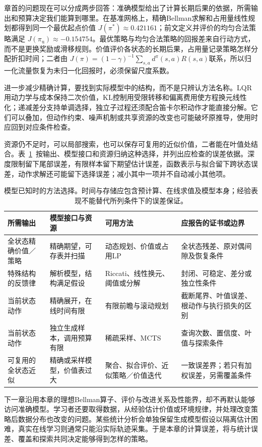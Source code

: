 章首的问题现在可以分成两步回答：准确模型给出了计算长期后果的依据，所需输出和预算决定我们能算到哪里。在基准网格上，精确Bellman求解和占用量线性规划都得到同一个最优起点价值
$J(\pi^*)\approx0.421161$；前文定义并评价的均匀合法策略满足
$J(\pi_{\mathrm u})\approx-0.154754$。最优策略与均匀合法策略的回报差来自行动方式，而不是更换奖励或滑移规则。价值评价各状态的长期后果，占用量记录策略怎样分配折扣时间；二者由
$J(\pi)=(1-\gamma)^{-1}\sum_{s,a}d^\pi(s,a)R(s,a)$联系，所以归一化流量恢复为未归一化回报时，必须保留尺度系数。

进一步减少精确计算，要找到实际模型中的结构，而不是只辨认方法名称。LQR用动力学与成本保持二次价值，KL控制用受限转移和偏离费用使方程换元线性化；递减差分支持单调选择，独立子过程还须配合笛卡尔积动作才能直接分解。它们可以叠加，但动作约束、噪声机制或共享资源的改变也可能破坏原推导，使用时应回到对应条件检查。

资源仍不足时，可以局部搜索，也可以保存可复用的近似价值，二者能在叶值处结合。表~\ref{tab:rl-planning-method-choice}~按输出、模型接口和资源归纳这种选择，并列出应检查的误差依据。深度限制留下尾部误差，有限样本留下期望估计误差，函数表示与拟合留下跨状态误差，动作求解还可能留下选择误差；减小其中一项并不自动减小其他项。

\begin{table}[htbp]
 \centering
 \small
 \begin{tabularx}{\linewidth}{@{}l>{\raggedright\arraybackslash}X>{\raggedright\arraybackslash}X>{\raggedright\arraybackslash}X@{}}
  \toprule
  所需输出 & 模型接口与资源 & 可用方法 & 应报告的证书或边界\\
  \midrule
  全状态精确价值／策略 & 精确期望，可存表并扫描 & 动态规划、价值或占用LP & 全状态残差、原对偶间隙及恢复条件\\
  特殊结构的反馈律 & 解析模型，结构满足假设 & Riccati、线性换元、阈值或分解 & 封闭、可稳定、差分或独立性条件\\
  当前状态动作 & 精确展开，在线时间有限 & 有限前瞻与滚动规划 & 截断尾界、叶值误差、根动作与执行损失的区别\\
  当前状态动作 & 独立生成样本，调用预算有限 & 稀疏采样、MCTS & 查询次数、置信度、叶值与探索条件\\
  可复用的全状态近似 & 精确或采样模型，价值表过大 & 聚合、拟合评价、近似策略／价值迭代 & 一致误差界；若只有加权误差，另需覆盖条件\\
  \bottomrule
 \end{tabularx}
 \caption{模型已知时的方法选择。时间与存储应包含预计算、在线求值及模型本身；经验表现不能替代所列条件下的误差保证。}
 \label{tab:rl-planning-method-choice}
\end{table}

下一章沿用本章的理想Bellman算子、评价与改进关系及性能界，却不再默认能够访问准确模型。学习者还要取得数据，从经验估计价值或环境规律，并处理改变策略后数据分布也改变的问题。某些统计分析会单独保留生成模型假设以隔离估计困难，真实在线学习则通常只能沿实际轨迹采集。于是本章的计算误差，将与统计误差、覆盖和探索共同决定能够得到怎样的策略。
